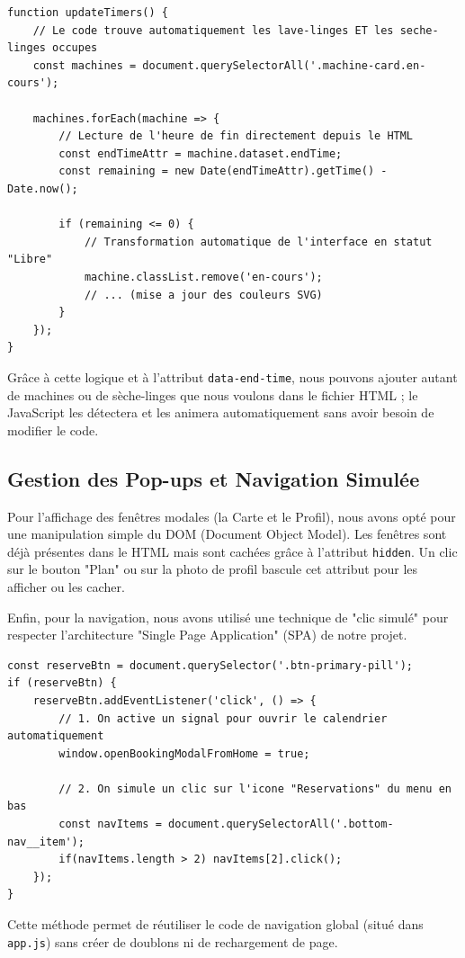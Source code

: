 \documentclass[12pt,a4paper]{article}
\begin{document}
\newpage
\begin{lstlisting}[caption={Extrait de la fonction de mise à jour du temps}]
function updateTimers() {
    // Le code trouve automatiquement les lave-linges ET les seche-linges occupes
    const machines = document.querySelectorAll('.machine-card.en-cours');

    machines.forEach(machine => {
        // Lecture de l'heure de fin directement depuis le HTML
        const endTimeAttr = machine.dataset.endTime;
        const remaining = new Date(endTimeAttr).getTime() - Date.now();

        if (remaining <= 0) {
            // Transformation automatique de l'interface en statut "Libre"
            machine.classList.remove('en-cours');
            // ... (mise a jour des couleurs SVG)
        }
    });
}
\end{lstlisting}

Grâce à cette logique et à l'attribut \texttt{data-end-time}, nous pouvons ajouter autant de machines ou de sèche-linges que nous voulons dans le fichier HTML ; le JavaScript les détectera et les animera automatiquement sans avoir besoin de modifier le code.

\subsection*{Gestion des Pop-ups et Navigation Simulée}
Pour l'affichage des fenêtres modales (la Carte et le Profil), nous avons opté pour une manipulation simple du DOM (Document Object Model). Les fenêtres sont déjà présentes dans le HTML mais sont cachées grâce à l'attribut \texttt{hidden}. Un clic sur le bouton "Plan" ou sur la photo de profil bascule cet attribut pour les afficher ou les cacher.

Enfin, pour la navigation, nous avons utilisé une technique de "clic simulé" pour respecter l'architecture "Single Page Application" (SPA) de notre projet. 


\begin{lstlisting}[caption={Exemple de navigation simulee vers les reservations}]
const reserveBtn = document.querySelector('.btn-primary-pill');
if (reserveBtn) {
    reserveBtn.addEventListener('click', () => {
        // 1. On active un signal pour ouvrir le calendrier automatiquement
        window.openBookingModalFromHome = true;

        // 2. On simule un clic sur l'icone "Reservations" du menu en bas
        const navItems = document.querySelectorAll('.bottom-nav__item');
        if(navItems.length > 2) navItems[2].click();
    });
}
\end{lstlisting}
Cette méthode permet de réutiliser le code de navigation global (situé dans \texttt{app.js}) sans créer de doublons ni de rechargement de page.
\end{document}
